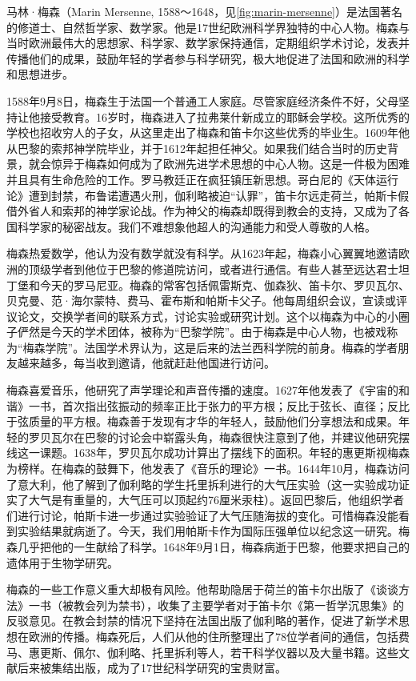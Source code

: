 \documentclass[b5paper]{ctexart}
\begin{document}
\begin{mdframed}
马林·梅森（Marin Mersenne, 1588～1648，见\cref{fig:marin-mersenne}）是法国著名的修道士、自然哲学家、数学家。他是17世纪欧洲科学界独特的中心人物。梅森与当时欧洲最伟大的思想家、科学家、数学家保持通信，定期组织学术讨论，发表并传播他们的成果，鼓励年轻的学者参与科学研究，极大地促进了法国和欧洲的科学和思想进步。

1588年9月8日，梅森生于法国一个普通工人家庭。尽管家庭经济条件不好，父母坚持让他接受教育。16岁时，梅森进入了拉弗莱什新成立的耶稣会学校。这所优秀的学校也招收穷人的子女，从这里走出了梅森和笛卡尔这些优秀的毕业生。1609年他从巴黎的索邦神学院毕业，并于1612年起担任神父。如果我们结合当时的历史背景，就会惊异于梅森如何成为了欧洲先进学术思想的中心人物。这是一件极为困难并且具有生命危险的工作。罗马教廷正在疯狂镇压新思想。哥白尼的《天体运行论》遭到封禁，布鲁诺遭遇火刑，伽利略被迫“认罪”，笛卡尔远走荷兰，帕斯卡假借外省人和索邦的神学家论战\footnotemark。作为神父的梅森却既得到教会的支持，又成为了各国科学家的秘密战友。我们不难想象他超人的沟通能力和受人尊敬的人格。

梅森热爱数学，他认为没有数学就没有科学。从1623年起，梅森小心翼翼地邀请欧洲的顶级学者到他位于巴黎的修道院访问，或者进行通信。有些人甚至远达君士坦丁堡和今天的罗马尼亚。梅森的常客包括佩雷斯克、伽森狄、笛卡尔、罗贝瓦尔、贝克曼、范·海尔蒙特、费马、霍布斯和帕斯卡父子。他每周组织会议，宣读或评议论文，交换学者间的联系方式，讨论实验或研究计划。这个以梅森为中心的小圈子俨然是今天的学术团体，被称为“巴黎学院”。由于梅森是中心人物，也被戏称为“梅森学院”。法国学术界认为，这是后来的法兰西科学院的前身。梅森的学者朋友越来越多，每当收到邀请，他就赶赴他国进行访问。

梅森喜爱音乐，他研究了声学理论和声音传播的速度。1627年他发表了《宇宙的和谐》一书，首次指出弦振动的频率正比于张力的平方根；反比于弦长、直径；反比于弦质量的平方根。梅森善于发现有才华的年轻人，鼓励他们分享想法和成果。年轻的罗贝瓦尔在巴黎的讨论会中崭露头角，梅森很快注意到了他，并建议他研究摆线这一课题。1638年，罗贝瓦尔成功计算出了摆线下的面积。年轻的惠更斯视梅森为榜样。在梅森的鼓舞下，他发表了《音乐的理论》一书。1644年10月，梅森访问了意大利，他了解到了伽利略的学生托里拆利进行的大气压实验（这一实验成功证实了大气是有重量的，大气压可以顶起约76厘米汞柱）。返回巴黎后，他组织学者们进行讨论，帕斯卡进一步通过实验验证了大气压随海拔的变化。可惜梅森没能看到实验结果就病逝了。今天，我们用帕斯卡作为国际压强单位以纪念这一研究。梅森几乎把他的一生献给了科学。1648年9月1日，梅森病逝于巴黎，他要求把自己的遗体用于生物学研究\cite{OConnor-Robertson-2005}。

梅森的一些工作意义重大却极有风险。他帮助隐居于荷兰的笛卡尔出版了《谈谈方法》一书（被教会列为禁书），收集了主要学者对于笛卡尔《第一哲学沉思集》的反驳意见。在教会封禁的情况下坚持在法国出版了伽利略的著作，促进了新学术思想在欧洲的传播\cite{Britannia-2024}。梅森死后，人们从他的住所整理出了78位学者间的通信，包括费马、惠更斯、佩尔、伽利略、托里拆利等人，若干科学仪器以及大量书籍。这些文献后来被集结出版，成为了17世纪科学研究的宝贵财富。
\end{mdframed}
\end{document}
